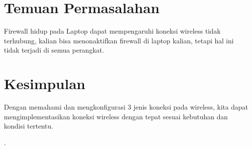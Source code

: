 \section{Temuan Permasalahan}
Firewall hidup pada Laptop dapat mempengaruhi koneksi wireless tidak terhubung, kalian
bisa menonaktifkan firewall di laptop kalian, tetapi hal ini tidak terjadi di semua perangkat.

\section{Kesimpulan}
Dengan memahami dan mengkonfigurasi 3 jenis koneksi pada wireless, kita dapat
mengimplementasikan koneksi wireless dengan tepat sesuai kebutuhan dan kondisi tertentu.

\cite{Newton1687}.